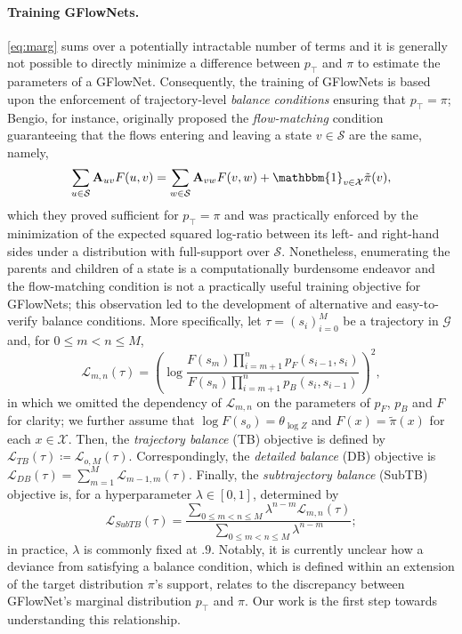 \documentclass{article}
\theoremstyle{plain}
\theoremstyle{definition}
\theoremstyle{remark}
\theoremstyle{remark}
\begin{document}
\paragraph{Training GFlowNets.} \autoref{eq:marg} sums over a potentially intractable number of terms and it is generally not possible to directly minimize a difference between $p_{\intercal}$ and $\pi$ to estimate the parameters of a GFlowNet. Consequently, the training of GFlowNets is based upon the enforcement of trajectory-level \textit{balance conditions} ensuring that $p_{\intercal} = \pi$; Bengio, for instance, originally proposed the \textit{flow-matching} condition guaranteeing that the flows entering and leaving a state $v \in \mathcal{S}$ are the same, namely, 
\begin{equation}
    \sum_{u \in \mathcal{S}} \mathbf{A}_{uv} F(u, v) = \sum_{w \in \mathcal{S}} \mathbf{A}_{vw} F(v, w) + \mathbbm{1}_{v \in \mathcal{X}} \tilde{\pi}(v),   
\end{equation}
which they proved sufficient for $p_{\intercal} = \pi$ and was practically enforced by the minimization of the expected squared log-ratio between its left- and right-hand sides under a distribution with full-support over $\mathcal{S}$. Nonetheless, enumerating the parents and children of a state is a computationally burdensome endeavor and the flow-matching condition is not a practically useful training objective for GFlowNets; this observation led to the development of alternative and easy-to-verify balance conditions. More specifically, let $\tau = (s_{i})_{i=0}^{M}$ be a trajectory in $\mathcal{G}$ and, for $0 \le m < n \le M$,  
\begin{equation} \label{eq:stbalance}  
    \mathcal{L}_{m, n}(\tau) = \left( \log \frac{F(s_{m}) \prod_{i = m + 1}^{n} p_{F}(s_{i - 1}, s_{i})}{F(s_{n}) \prod_{i = m + 1}^{n} p_{B}(s_{i}, s_{i - 1})} \right)^{2},  %
\end{equation}
in which we omitted the dependency of $\mathcal{L}_{m, n}$ on the parameters of $p_{F}$, $p_{B}$ and $F$ for clarity; we further assume that $\log F(s_{o}) = \theta_{\log Z}$ and $F(x) = \tilde{\pi}(x)$ for each $x \in \mathcal{X}$. Then, the \textit{trajectory balance} (TB) objective is defined by $\mathcal{L}_{TB}(\tau) \coloneqq \mathcal{L}_{o, M}(\tau)$. Correspondingly, the \textit{detailed balance} (DB) objective is $\mathcal{L}_{DB}(\tau) = \sum_{m=1}^{M} \mathcal{L}_{m - 1, m}(\tau)$. Finally, the \textit{subtrajectory balance} (SubTB) objective is, for a hyperparameter $\lambda \in [0, 1]$, determined by   
\begin{equation}
    \mathcal{L}_{SubTB}(\tau) = \frac{\sum_{0 \le m < n \le M} \lambda^{n - m} \mathcal{L}_{m, n}(\tau)}{\sum_{0 \le m < n \le M} \lambda^{n - m}}; 
\end{equation}
in practice, $\lambda$ is commonly fixed at $.9$. Notably, it is currently unclear how a deviance from satisfying a balance condition, which is defined within an extension of the target distribution $\pi$'s support, relates to the discrepancy between GFlowNet's marginal distribution $p_{\intercal}$ and $\pi$. Our work is the first step towards  understanding this relationship.  
\end{document}
